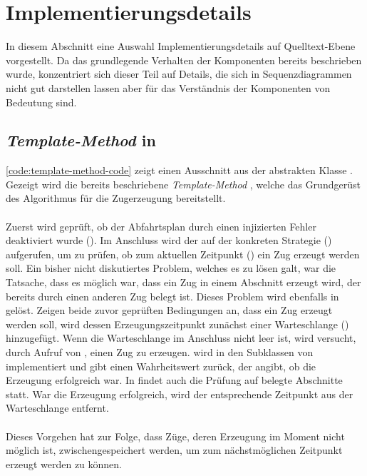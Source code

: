 \section{Implementierungsdetails}

In diesem Abschnitt eine Auswahl Implementierungsdetails auf Quelltext-Ebene vorgestellt. Da das grundlegende Verhalten der Komponenten bereits beschrieben wurde, konzentriert sich dieser Teil auf Details, die sich in Sequenzdiagrammen nicht gut darstellen lassen aber für das Verständnis der Komponenten von Bedeutung sind.

\subsection{\emph{Template-Method} in }

\autoref{code:template-method-code} zeigt einen Ausschnitt aus der abstrakten Klasse . Gezeigt wird die bereits beschriebene \emph{Template-Method} , welche das Grundgerüst des Algorithmus für die Zugerzeugung bereitstellt.\\
\\
Zuerst wird geprüft, ob der Abfahrtsplan durch einen injizierten Fehler deaktiviert wurde (). Im Anschluss wird der  auf der konkreten Strategie () aufgerufen, um zu prüfen, ob zum aktuellen Zeitpunkt () ein Zug erzeugt werden soll. Ein bisher nicht diskutiertes Problem, welches es zu lösen galt, war die Tatsache, dass es möglich war, dass ein Zug in einem Abschnitt erzeugt wird, der bereits durch einen anderen Zug belegt ist. Dieses Problem wird ebenfalls in  gelöst. Zeigen beide zuvor geprüften Bedingungen an, dass ein Zug erzeugt werden soll, wird dessen Erzeugungszeitpunkt zunächst einer Warteschlange () hinzugefügt. Wenn die Warteschlange im Anschluss nicht leer ist, wird versucht, durch Aufruf von , einen Zug zu erzeugen.  wird in den Subklassen von  implementiert und gibt einen Wahrheitswert zurück, der angibt, ob die Erzeugung erfolgreich war. In  findet auch die Prüfung auf belegte Abschnitte statt. War die Erzeugung erfolgreich, wird der entsprechende Zeitpunkt aus der Warteschlange entfernt.\\
\\
Dieses Vorgehen hat zur Folge, dass Züge, deren Erzeugung im Moment nicht möglich ist, zwischengespeichert werden, um zum nächstmöglichen Zeitpunkt erzeugt werden zu können.

